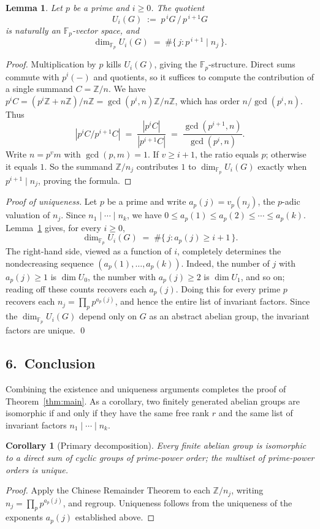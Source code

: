 \documentclass{article}
\newtheorem{lemma}[theorem]{Lemma}
\newtheorem{corollary}[theorem]{Corollary}
\theoremstyle{definition}
\begin{document}
\begin{lemma}\label{lem:pdim}
Let $p$ be a prime and $i\ge 0$. The quotient
\[
  U_i(G)\;:=\;p^{\,i}G\,\big/\,p^{\,i+1}G
\]
is naturally an $\mathbb{F}_p$-vector space, and
\[
  \dim_{\mathbb{F}_p}U_i(G)
  \;=\;\#\{\,j:p^{\,i+1}\mid n_j\,\}.
\]
\end{lemma}
\begin{proof}
Multiplication by $p$ kills $U_i(G)$, giving the $\mathbb{F}_p$-structure.
Direct sums commute with $p^i(-)$ and quotients, so it suffices to
compute the contribution of a single summand $C=\mathbb{Z}/n$. We have
$p^iC=(p^i\mathbb{Z}+n\mathbb{Z})/n\mathbb{Z}=\gcd(p^i,n)\mathbb{Z}/n\mathbb{Z}$, which has order
$n/\gcd(p^i,n)$. Thus
\[
  |p^iC/p^{i+1}C|
  \;=\;\frac{|p^iC|}{|p^{i+1}C|}
  \;=\;\frac{\gcd(p^{i+1},n)}{\gcd(p^i,n)}.
\]
Write $n=p^{v}m$ with $\gcd(p,m)=1$. If $v\ge i+1$, the ratio equals
$p$; otherwise it equals $1$. So the summand $\mathbb{Z}/n_j$ contributes
$1$ to $\dim_{\mathbb{F}_p}U_i(G)$ exactly when $p^{i+1}\mid n_j$, proving
the formula.
\end{proof}

\begin{proof}[Proof of uniqueness]
Let $p$ be a prime and write $a_p(j)=v_p(n_j)$, the $p$-adic valuation
of $n_j$. Since $n_1\mid\cdots\mid n_k$, we have
$0\le a_p(1)\le a_p(2)\le\cdots\le a_p(k)$.
Lemma~\ref{lem:pdim} gives, for every $i\ge 0$,
\[
  \dim_{\mathbb{F}_p}U_i(G)\;=\;\#\{\,j:a_p(j)\ge i+1\,\}.
\]
The right-hand side, viewed as a function of $i$, completely determines
the nondecreasing sequence $(a_p(1),\dots,a_p(k))$. Indeed, the number
of $j$ with $a_p(j)\ge 1$ is $\dim U_0$, the number with
$a_p(j)\ge 2$ is $\dim U_1$, and so on; reading off these counts
recovers each $a_p(j)$. Doing this for every prime $p$ recovers each
$n_j=\prod_p p^{a_p(j)}$, and hence the entire list of invariant
factors. Since the $\dim_{\mathbb{F}_p}U_i(G)$ depend only on $G$ as an
abstract abelian group, the invariant factors are unique. \qed
\end{proof}

\subsection*{6.\ Conclusion}

Combining the existence and uniqueness arguments completes the proof of
Theorem~\ref{thm:main}. As a corollary, two finitely generated abelian
groups are isomorphic if and only if they have the same free rank $r$
and the same list of invariant factors $n_1\mid\cdots\mid n_k$.

\begin{corollary}[Primary decomposition]
Every finite abelian group is isomorphic to a direct sum of cyclic
groups of prime-power order; the multiset of prime-power orders is
unique.
\end{corollary}
\begin{proof}
Apply the Chinese Remainder Theorem to each $\mathbb{Z}/n_j$, writing
$n_j=\prod_pp^{a_p(j)}$, and regroup. Uniqueness follows from the
uniqueness of the exponents $a_p(j)$ established above.
\end{proof}
\end{document}

